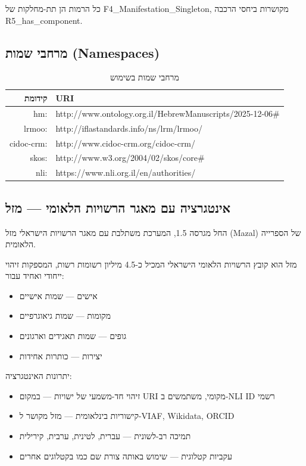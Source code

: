 כל הרמות הן תת-מחלקות של \textenglish{F4\_Manifestation\_Singleton}, מקושרות ביחסי הרכבה \textenglish{R5\_has\_component}.

\subsection{מרחבי שמות (Namespaces)}

\begin{table}[h]
\centering
\begin{tabular}{|r|l|}
\hline
\textbf{קידומת} & \textbf{URI} \\
\hline
hm: & http://www.ontology.org.il/HebrewManuscripts/2025-12-06\# \\
lrmoo: & http://iflastandards.info/ns/lrm/lrmoo/ \\
cidoc-crm: & http://www.cidoc-crm.org/cidoc-crm/ \\
skos: & http://www.w3.org/2004/02/skos/core\# \\
\textcolor{newaddition}{nli:} & \textcolor{newaddition}{https://www.nli.org.il/en/authorities/} \\
\hline
\end{tabular}
\caption{מרחבי שמות בשימוש}
\end{table}

\subsection{\textcolor{newaddition}{אינטגרציה עם מאגר הרשויות הלאומי — מזל}}

\textcolor{newaddition}{החל מגרסה 1.5, המערכת משתלבת עם מאגר הרשויות הישראלי מזל \textenglish{(Mazal)} של הספרייה הלאומית.}

\textcolor{newaddition}{מזל הוא קובץ הרשויות הלאומי הישראלי המכיל כ-4.5 מיליון רשומות רשות, המספקות זיהוי ייחודי ואחיד עבור:}
\begin{itemize}
\item \textcolor{newaddition}{אישים — שמות אישיים}
\item \textcolor{newaddition}{מקומות — שמות גיאוגרפיים}
\item \textcolor{newaddition}{גופים — שמות תאגידים וארגונים}
\item \textcolor{newaddition}{יצירות — כותרות אחידות}
\end{itemize}

\textcolor{newaddition}{יתרונות האינטגרציה:}
\begin{itemize}
\item \textcolor{newaddition}{זיהוי חד-משמעי של ישויות — במקום URI מקומי, משתמשים ב-NLI ID רשמי}
\item \textcolor{newaddition}{קישוריות בינלאומית — מזל מקושר ל-VIAF, Wikidata, ORCID}
\item \textcolor{newaddition}{תמיכה רב-לשונית — עברית, לטינית, ערבית, קירילית}
\item \textcolor{newaddition}{עקביות קטלוגית — שימוש באותה צורת שם כמו בקטלוגים אחרים}
\end{itemize}

